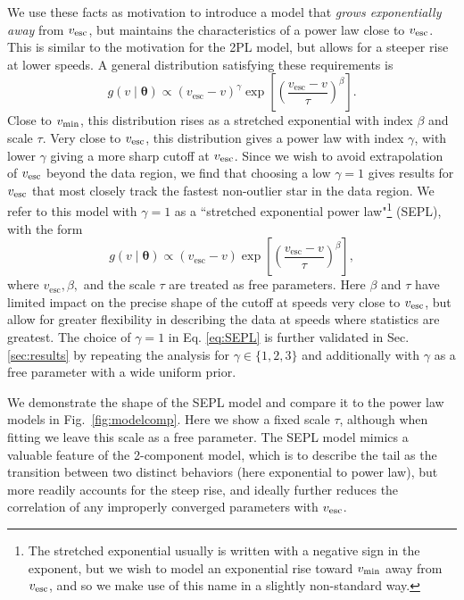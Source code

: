 We use these facts as motivation to introduce a model that \textit{grows exponentially away} from $v_{\rm{esc}}$, but maintains the characteristics of a power law close to $v_{\rm{esc}}$. This is similar to the motivation for the 2PL model, but allows for a steeper rise at lower speeds. A general distribution satisfying these requirements is 
\begin{equation}
    g(v \mid \mathbf{\theta}) \propto (v_\mathrm{esc} - v)^\gamma \exp\left[\left(\frac{v_\mathrm{esc} - v}{\tau}\right)^\beta\right].
    \label{eq:generalSEPL}
\end{equation}
Close to $v_{\rm{min}}$, this distribution rises as a stretched exponential with index $\beta$ and scale $\tau$. Very close to $v_{\rm{esc}}$, this distribution gives a power law with index $\gamma$, with lower $\gamma$ giving a more sharp cutoff at $v_{\rm{esc}}$. Since we wish to avoid extrapolation of $v_{\rm{esc}}$ beyond the data region, we find that choosing a low $\gamma = 1$ gives results for $v_{\rm{esc}}$ that most closely track the fastest non-outlier star in the data region. We refer to this model with $\gamma=1$ as a ``stretched exponential power law"\footnote{The stretched exponential usually is written with a negative sign in the exponent, but we wish to model an exponential rise toward $v_{\rm{min}}$ away from $v_{\rm{esc}}$, and so we make use of this name in a slightly non-standard way.} (SEPL), with the form
\begin{equation}\label{eq:SEPL}
    g(v \mid \mathbf{\theta}) \propto (v_\mathrm{esc} - v) \exp\left[\left(\frac{v_\mathrm{esc} - v}{\tau}\right)^\beta\right],
\end{equation}
where $v_\mathrm{esc}, \beta,$ and the scale $\tau$ are treated as free parameters. Here $\beta$ and $\tau$ have limited impact on the precise shape of the cutoff at speeds very close to $v_{\rm{esc}}$, but allow for greater flexibility in describing the data at speeds where statistics are greatest. The choice of $\gamma=1$ in Eq. \ref{eq:SEPL} is further validated in Sec. \ref{sec:results} by repeating the analysis for $\gamma \in \{1,2,3\}$ and additionally with $\gamma$ as a free parameter with a wide uniform prior.

We demonstrate the shape of the SEPL model and compare it to the power law models in Fig.~\ref{fig:modelcomp}. Here we show a fixed scale $\tau$, although when fitting we leave this scale as a free parameter. The SEPL model mimics a valuable feature of the 2-component model, which is to describe the tail as the transition between two distinct behaviors (here exponential to power law), but more readily accounts for the steep rise, and ideally further reduces the correlation of any improperly converged parameters with $v_{\rm{esc}}$. 

